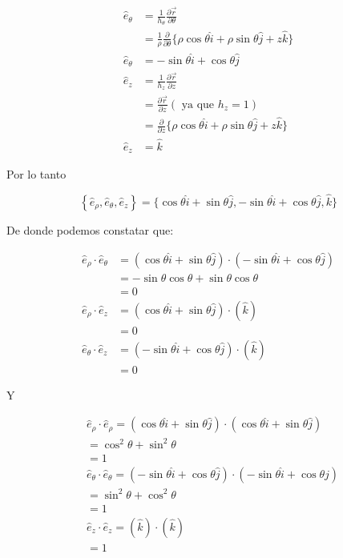 $$
\begin{aligned}
\hat{e}_{\theta} & =\frac{1}{h_{\theta}} \frac{\partial \vec{r}}{\partial \theta} \\
& =\frac{1}{\rho} \frac{\partial}{\partial \theta}\{\rho \cos \theta \hat{i}+\rho \sin \theta \hat{j}+z \hat{k}\} \\
\hat{e}_{\theta} & =-\sin \theta \hat{i}+\cos \theta \hat{j} \\
\widehat{e}_{z} & =\frac{1}{h_{z}} \frac{\partial \vec{r}}{\partial z} \\
& =\frac{\partial \vec{r}}{\partial z}\left(\text { ya que } h_{z}=1\right) \\
& =\frac{\partial}{\partial z}\{\rho \cos \theta \hat{i}+\rho \sin \theta \hat{j}+z \hat{k}\} \\
\hat{e}_{z} & =\hat{k}
\end{aligned}
$$

Por lo tanto

$$
\left\{\widehat{e}_{\rho}, \hat{e}_{\theta}, \hat{e}_{z}\right\}=\{\cos \theta \hat{i}+\sin \theta \hat{j},-\sin \theta \hat{i}+\cos \theta \hat{j}, \hat{k}\}
$$

De donde podemos constatar que:

$$
\begin{aligned}
\widehat{e}_{\rho} \cdot \hat{e}_{\theta} & =(\cos \theta \hat{i}+\sin \theta \hat{j}) \cdot(-\sin \theta \hat{i}+\cos \theta \hat{j}) \\
& =-\sin \theta \cos \theta+\sin \theta \cos \theta \\
& =0 \\
\hat{e}_{\rho} \cdot \widehat{e}_{z} & =(\cos \theta \hat{i}+\sin \theta \hat{j}) \cdot(\hat{k}) \\
& =0 \\
\widehat{e}_{\theta} \cdot \hat{e}_{z} & =(-\sin \theta \hat{i}+\cos \theta \hat{j}) \cdot(\hat{k}) \\
& =0
\end{aligned}
$$

$\mathrm{Y}$

$$
\begin{aligned}
& \hat{e}_{\rho} \cdot \hat{e}_{\rho}=(\cos \theta \hat{i}+\sin \theta \hat{j}) \cdot(\cos \theta \hat{i}+\sin \theta \hat{j}) \\
& =\cos ^{2} \theta+\sin ^{2} \theta \\
& =1 \\
& \widehat{e}_{\theta} \cdot \hat{e}_{\theta}=(-\sin \theta \hat{i}+\cos \theta \hat{j}) \cdot(-\sin \theta \hat{i}+\cos \theta \hat{j}) \\
& =\sin ^{2} \theta+\cos ^{2} \theta \\
& =1 \\
& \hat{e}_{z} \cdot \hat{e}_{z}=(\hat{k}) \cdot(\widehat{k}) \\
& =1
\end{aligned}
$$

